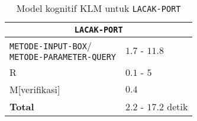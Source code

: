\begin{table}[H]
  \centering
  \begin{tabularx}{\columnwidth}{lX}
    \hline
    \multicolumn{2}{c}{\textbf{\texttt{LACAK-PORT}}} \\
    \hline

    \makecell{\texttt{METODE-INPUT-BOX}/\\\texttt{METODE-PARAMETER-QUERY}}
    & $1.7$ - $11.8$ \\
    R & $0.1$ - $5$ \\
    M[verifikasi] & $0.4$ \\

    \hline
    \textbf{Total} & $2.2$ - $17.2$ detik \\
    \hline
  \end{tabularx}
  \caption{Model kognitif KLM untuk \texttt{LACAK-PORT}}
\end{table}
